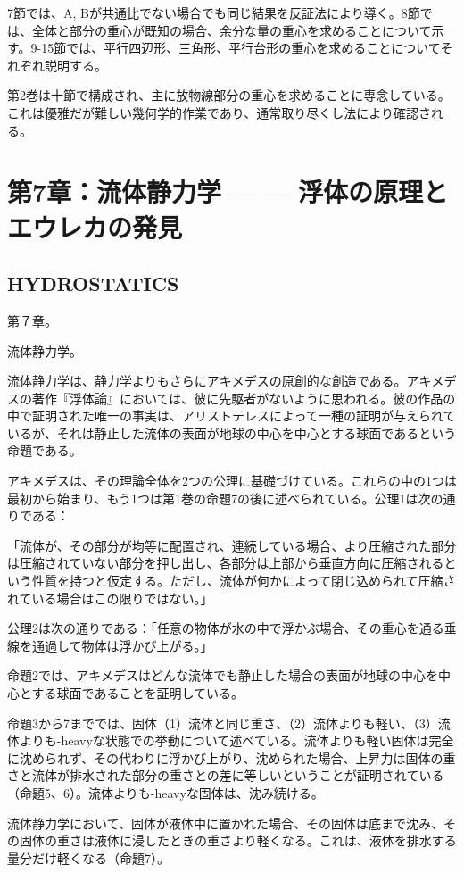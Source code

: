 \documentclass[a4paper,11pt,openany]{ltjsbook}
\begin{document}
7節では、A, Bが共通比でない場合でも同じ結果を反証法により導く。8節では、全体と部分の重心が既知の場合、余分な量の重心を求めることについて示す。9-15節では、平行四辺形、三角形、平行台形の重心を求めることについてそれぞれ説明する。

第2巻は十節で構成され、主に放物線部分の重心を求めることに専念している。これは優雅だが難しい幾何学的作業であり、通常取り尽くし法により確認される。

\clearpage

\chapter{第7章：流体静力学 —— 浮体の原理とエウレカの発見}
\section*{HYDROSTATICS}

第７章。

流体静力学。

流体静力学は、静力学よりもさらにアキメデスの原創的な創造である。アキメデスの著作『浮体論』においては、彼に先駆者がないように思われる。彼の作品の中で証明された唯一の事実は、アリストテレスによって一種の証明が与えられているが、それは静止した流体の表面が地球の中心を中心とする球面であるという命題である。

アキメデスは、その理論全体を2つの公理に基礎づけている。これらの中の1つは最初から始まり、もう1つは第1巻の命題7の後に述べられている。公理1は次の通りである：

「流体が、その部分が均等に配置され、連続している場合、より圧縮された部分は圧縮されていない部分を押し出し、各部分は上部から垂直方向に圧縮されるという性質を持つと仮定する。ただし、流体が何かによって閉じ込められて圧縮されている場合はこの限りではない。」

公理2は次の通りである：「任意の物体が水の中で浮かぶ場合、その重心を通る垂線を通過して物体は浮かび上がる。」

命題2では、アキメデスはどんな流体でも静止した場合の表面が地球の中心を中心とする球面であることを証明している。

命題3から7まででは、固体（1）流体と同じ重さ、（2）流体よりも軽い、（3）流体よりも-heavyな状態での挙動について述べている。流体よりも軽い固体は完全に沈められず、その代わりに浮かび上がり、沈められた場合、上昇力は固体の重さと流体が排水された部分の重さとの差に等しいということが証明されている（命題5、6）。流体よりも-heavyな固体は、沈み続ける。

流体静力学において、固体が液体中に置かれた場合、その固体は底まで沈み、その固体の重さは液体に浸したときの重さより軽くなる。これは、液体を排水する量分だけ軽くなる（命題7）。
\end{document}
